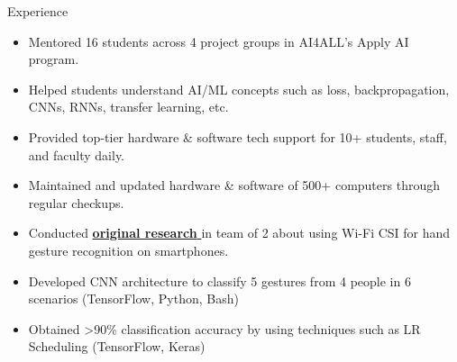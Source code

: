 \documentclass{resume} %
\begin{document}
\begin{workSection}{Experience}
    \experienceItem[
        company=AI4ALL,
        location=Remote,
        position=Student Coordinator,
        duration=August 2023 {-} Present
    ]
    \begin{itemize}
        \vspace{-0.5em}
        \itemsep -6pt {}
        \item Mentored 16 students across 4 project groups in AI4ALL's Apply AI program.
        \item Helped students understand AI/ML concepts such as loss, backpropagation, CNNs, RNNs, transfer learning, etc.
    \end{itemize}
    \experienceItem[
        company=UTEP,
        location=El Paso{,} TX,
        position=Computer Lab Assistant,
        duration=January 2023 {-} Present
    ]
    \begin{itemize}
        \vspace{-0.5em}
        \itemsep -6pt {}
        \item Provided top-tier hardware \& software tech support for 10+ students, staff, and faculty daily.
        \item Maintained and updated hardware \& software of 500+ computers through regular checkups.
    \end{itemize}
    \experienceItem[
    company=Temple University,
    location=Philadelphia{,} PA,
    position=Undergraduate Researcher,
    duration=June {-} July 2023
    ]
    \begin{itemize}
        \vspace{-0.5em}
        \itemsep -6pt {}
        \item Conducted \href{https://drive.google.com/file/d/1HG4S5iSNb0nX2yN3LfSsRilemFDamnaN/view?usp=sharing}{\textbf{original research} \faExternalLink} in team of 2 about using Wi-Fi CSI for hand gesture recognition on smartphones.
        \item Developed CNN architecture to classify 5 gestures from 4 people in 6 scenarios (TensorFlow, Python, Bash)
        \item Obtained >90\% classification accuracy by using techniques such as LR Scheduling (TensorFlow, Keras)
    \end{itemize}

\end{workSection}
\end{document}
